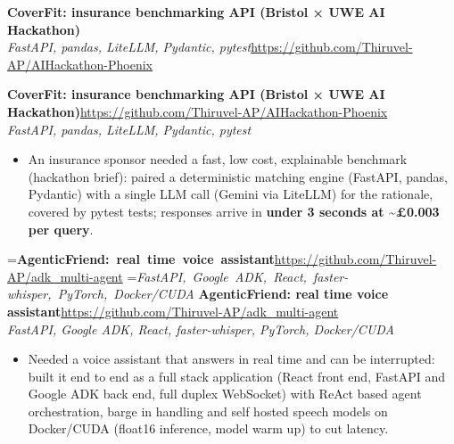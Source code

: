 \documentclass[a4paper,11pt]{article}
\newcommand{\project}[3]{%
  \textbf{#1}\hfill#3\\ {\color{muted}\small\textit{#2}}\par}
\newcommand{\gap}{\vspace{5pt}}
\newcommand{\num}[1]{\textbf{#1}}   %
\begin{document}
\else
\textbf{CoverFit: insurance benchmarking API (Bristol × UWE AI Hackathon)}\\ {\color{muted}\small\textit{FastAPI, pandas, LiteLLM, Pydantic, pytest}}\hfill{\small\url{https://github.com/Thiruvel-AP/AIHackathon-Phoenix}}\par
\fi
\else
\project{CoverFit: insurance benchmarking API (Bristol × UWE AI Hackathon)}{FastAPI, pandas, LiteLLM, Pydantic, pytest}{\url{https://github.com/Thiruvel-AP/AIHackathon-Phoenix}}
\fi
\begin{itemize}
  \item An insurance sponsor needed a fast, low cost, explainable benchmark (hackathon brief): paired a deterministic matching engine (FastAPI, pandas, Pydantic) with a single LLM call (Gemini via LiteLLM) for the rationale, covered by pytest tests; responses arrive in \num{under 3 seconds at \textasciitilde{}£0.003 per query}.
\end{itemize}
\gap
{}
=\hbox{\textbf{AgenticFriend: real time voice assistant}\hspace{1em}\url{https://github.com/Thiruvel-AP/adk_multi-agent}}%
=\hbox{{\small\textit{FastAPI, Google ADK, React, faster-whisper, PyTorch, Docker/CUDA}}}%
\ifdim\wd0>\linewidth
\ifdim\wd2>\linewidth
\textbf{AgenticFriend: real time voice assistant}\\ {\color{muted}\small\textit{FastAPI, Google ADK, React, faster-whisper, PyTorch, Docker/CUDA}}\\ \hspace*{\fill}{\small\url{https://github.com/Thiruvel-AP/adk_multi-agent}}\par
\else
\textbf{AgenticFriend: real time voice assistant}\\ {\color{muted}\small\textit{FastAPI, Google ADK, React, faster-whisper, PyTorch, Docker/CUDA}}\hfill{\small\url{https://github.com/Thiruvel-AP/adk_multi-agent}}\par
\fi
\else
\project{AgenticFriend: real time voice assistant}{FastAPI, Google ADK, React, faster-whisper, PyTorch, Docker/CUDA}{\url{https://github.com/Thiruvel-AP/adk_multi-agent}}
\fi
\begin{itemize}
  \item Needed a voice assistant that answers in real time and can be interrupted: built it end to end as a full stack application (React front end, FastAPI and Google ADK back end, full duplex WebSocket) with ReAct based agent orchestration, barge in handling and self hosted speech models on Docker/CUDA (float16 inference, model warm up) to cut latency.
\end{itemize}
\end{document}
